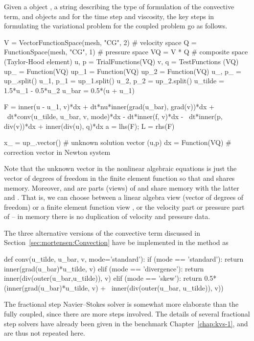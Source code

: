 Given a  object , a string  describing
the type of formulation of the convective term, and 
objects  and  for the time step and viscosity, the key
steps in formulating the variational problem for the coupled problem
go as follows.
\begin{python}
V = VectorFunctionSpace(mesh, "CG", 2)  # velocity space
Q = FunctionSpace(mesh, "CG", 1)        # pressure space
VQ = V * Q  # composite space (Taylor-Hood element)
u, p = TrialFunctions(VQ)
v, q = TestFunctions (VQ)
up_  = Function(VQ)
up_1 = Function(VQ)
up_2 = Function(VQ)
u_, p_ = up_.split()
u_1, p_1 = up_1.split()
u_2, p_2 = up_2.split()
u_tilde = 1.5*u_1 - 0.5*u_2
u_bar = 0.5*(u + u_1)

F  = inner(u - u_1, v)*dx + dt*nu*inner(grad(u_bar), grad(v))*dx + \
     dt*conv(u_tilde, u_bar, v, mode)*dx - dt*inner(f, v)*dx - \
     dt*inner(p, div(v))*dx + inner(div(u), q)*dx
a = lhs(F); L = rhs(F)

x_ = up_.vector()  # unknown solution vector (u,p)
dx = Function(VQ)  # correction vector in Newton system
\end{python}
Note that the unknown vector  in the nonlinear algebraic
equations is just the vector of degrees of freedom in the 
finite element function so that \emp{up\_} and  shares
memory. Moreover, \emp{u\_} and \emp{p\_} are parts (views) of
 and share memory with the latter and \emp{x\_}.  That is,
we can choose between a linear algebra view \emp{x\_} (vector of
degrees of freedom) or a finite element function view , or
the velocity part \emp{u\_} or pressure part \emp{p\_} of \emp{up\_}
-- in memory there is no duplication of velocity and pressure data.

The three alternative versions of the convective term discussed in
Section~\ref{sec:mortensen:Convection} have be implemented in the method
\emp{conv} as
\begin{python}
def conv(u_tilde, u_bar, v, mode='standard'):
    if (mode == 'standard'):
        return inner(grad(u_bar)*u_tilde, v)
    elif (mode == 'divergence'):
        return inner(div(outer(u_bar,u_tilde)), v)
    elif (mode == 'skew'):
        return 0.5*(inner(grad(u_bar)*u_tilde, v) + \
        inner(div(outer(u_bar, u_tilde)), v))
\end{python}
The fractional step Navier--Stokes solver is somewhat more elaborate
than the fully coupled, since there are more steps involved. The
details of several fractional step solvers have already been given in
the benchmark Chapter~\ref{chap:kvs-1}, and are thus not repeated here.

